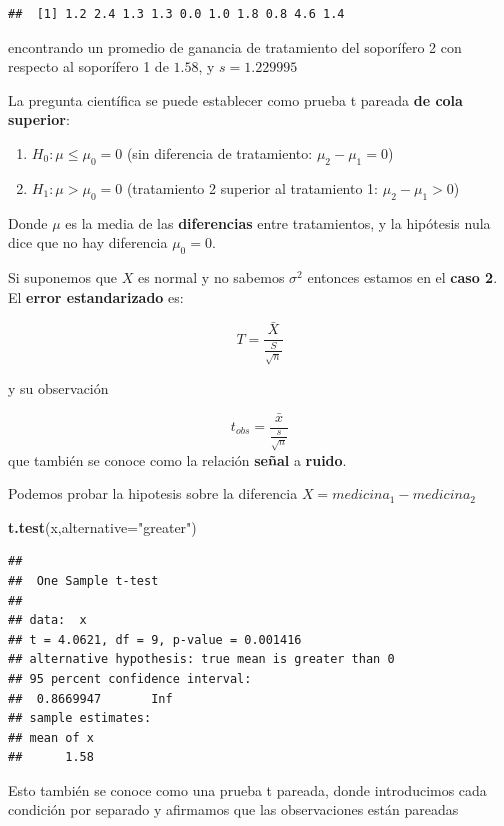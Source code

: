\documentclass[
]{book}
\newenvironment{Shaded}{\begin{snugshade}}{\end{snugshade}}
\newcommand{\AttributeTok}[1]{\textcolor[rgb]{0.13,0.29,0.53}{#1}}
\newcommand{\FunctionTok}[1]{\textcolor[rgb]{0.13,0.29,0.53}{\textbf{#1}}}
\newcommand{\NormalTok}[1]{#1}
\newcommand{\StringTok}[1]{\textcolor[rgb]{0.31,0.60,0.02}{#1}}
\providecommand{\tightlist}{%
  \setlength{\itemsep}{0pt}\setlength{\parskip}{0pt}}
\begin{document}
\begin{verbatim}
##  [1] 1.2 2.4 1.3 1.3 0.0 1.0 1.8 0.8 4.6 1.4
\end{verbatim}

encontrando un promedio de ganancia de tratamiento del soporífero 2 con respecto al soporífero 1 de \(1.58\), y \(s=1.229995\)

La pregunta científica se puede establecer como prueba t pareada \textbf{de cola superior}:

\begin{enumerate}
\def\labelenumi{\alph{enumi}.}
\tightlist
\item
  \(H_0:\mu \leq \mu_0=0\) (sin diferencia de tratamiento: \(\mu_2-\mu_1=0\))
\item
  \(H_1:\mu > \mu_0= 0\) (tratamiento 2 superior al tratamiento 1: \(\mu_2-\mu_1>0\))
\end{enumerate}

Donde \(\mu\) es la media de las \textbf{diferencias} entre tratamientos, y la hipótesis nula dice que no hay diferencia \(\mu_0=0\).

Si suponemos que \(X\) es normal y no sabemos \(\sigma^2\) entonces estamos en el \textbf{caso 2}. El \textbf{error estandarizado} es:

\[T=\frac{\bar{X}}{\frac{S}{\sqrt{n}}}\]

y su observación

\[t_{obs}=\frac{\bar{x}}{\frac{s}{\sqrt{n}}}\]
que también se conoce como la relación \textbf{señal} a \textbf{ruido}.

Podemos probar la hipotesis sobre la diferencia \(X=medicina_1-medicina_2\)

\begin{Shaded}
\begin{Highlighting}[]
\FunctionTok{t.test}\NormalTok{(x,}\AttributeTok{alternative=}\StringTok{"greater"}\NormalTok{)}
\end{Highlighting}
\end{Shaded}

\begin{verbatim}
## 
##  One Sample t-test
## 
## data:  x
## t = 4.0621, df = 9, p-value = 0.001416
## alternative hypothesis: true mean is greater than 0
## 95 percent confidence interval:
##  0.8669947       Inf
## sample estimates:
## mean of x 
##      1.58
\end{verbatim}

Esto también se conoce como una prueba t pareada, donde introducimos cada condición por separado y afirmamos que las observaciones están pareadas
\end{document}
